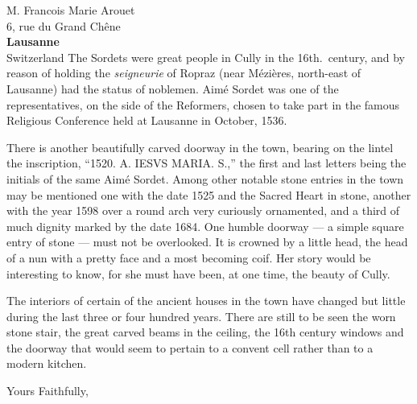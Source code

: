 \documentclass[11pt,french,bruni]{hletter}
\begin{document}
\begin{letter}{M. Francois Marie Arouet \\
               6, rue du Grand Ch\^{e}ne \\
               \textbf{Lausanne} \\
               Switzerland}
The Sordets were great people in Cully in the 16th.\ century, and by
reason of holding the \emph{seigneurie} of Ropraz (near M\'{e}zi\`{e}res,
north-east of Lausanne) had the status of noblemen. Aim\'{e} Sordet was one
of the representatives, on the side of the Reformers, chosen to take
part in the famous Religious Conference held at Lausanne in October,
1536.

There is another beautifully carved doorway in the town, bearing on the
lintel the inscription, ``1520. A. IESVS MARIA. S.,'' the first and
last letters being the initials of the same Aim\'{e} Sordet. Among other
notable stone entries in the town may be mentioned one with the date
1525 and the Sacred Heart in stone, another with the year 1598 over a
round arch very curiously ornamented, and a third of much dignity
marked by the date 1684. One humble doorway --- a simple square entry
of stone --- must not be overlooked. It is crowned by a little head,
the head of a nun with a pretty face and a most becoming coif. Her
story would be interesting to know, for she must have been, at one
time, the beauty of Cully.

The interiors of certain of the ancient houses in the town have changed
but little during the last three or four hundred years. There are still
to be seen the worn stone stair, the great carved beams in the ceiling,
the 16th century windows and the doorway that would seem to pertain to
a convent cell rather than to a modern kitchen.

 \closing{Yours Faithfully,}

\vfill
{}


\end{letter}
\end{document}
